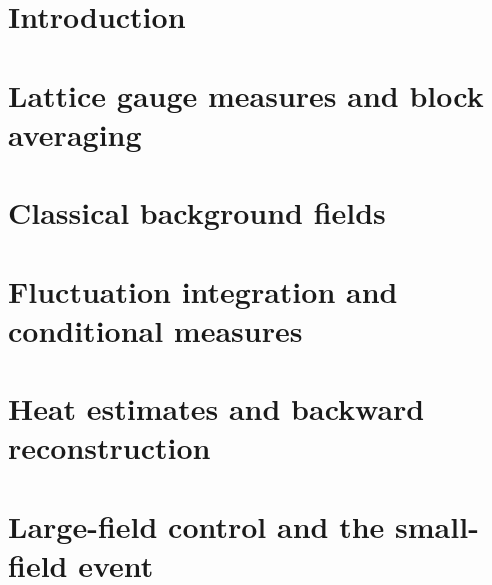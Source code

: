 \documentclass[12pt,oneside,openany]{book}
\begin{document}
\frontmatter
{}
\begin{authorsnote}

\end{authorsnote}
\begin{abstractpage}

\end{abstractpage}
\tableofcontents
\mainmatter

\part{Introduction}\label{part:intro}





\part{Lattice gauge measures and block averaging}\label{part:finite}





\part{Classical background fields}\label{part:background}




\part{Fluctuation integration and conditional measures}\label{part:rg}





\part{Heat estimates and backward reconstruction}\label{part:reconstruction}



\part{Large-field control and the small-field event}\label{part:largefield}






\end{document}
